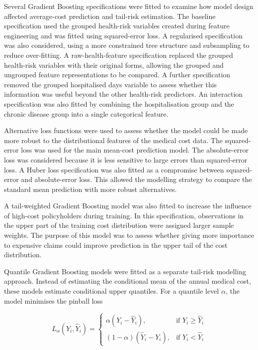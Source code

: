 	Several Gradient Boosting specifications were fitted to examine how model design affected average-cost prediction and tail-risk estimation. The baseline specification used the grouped health-risk variables created during feature engineering and was fitted using squared-error loss. A regularised specification was also considered, using a more constrained tree structure and subsampling to reduce over-fitting. A raw-health-feature specification replaced the grouped health-risk variables with their original forms, allowing the grouped and ungrouped feature representations to be compared. A further specification removed the grouped hospitalised days variable to assess whether this information was useful beyond the other health-risk predictors. An interaction specification was also fitted by combining the hospitalisation group and the chronic disease group into a single categorical feature.
	
	Alternative loss functions were used to assess whether the model could be made more robust to the distributional features of the medical cost data. The squared-error loss was used for the main mean-cost prediction model. The absolute-error loss was considered because it is less sensitive to large errors than squared-error loss. A Huber loss specification was also fitted as a compromise between squared-error and absolute-error loss. This allowed the modelling strategy to compare the standard mean prediction with more robust alternatives.
	
	A tail-weighted Gradient Boosting model was also fitted to increase the influence of high-cost policyholders during training. In this specification, observations in the upper part of the training cost distribution were assigned larger sample weights. The purpose of this model was to assess whether giving more importance to expensive claims could improve prediction in the upper tail of the cost distribution.
	
	Quantile Gradient Boosting models were fitted as a separate tail-risk modelling approach. Instead of estimating the conditional mean of the annual medical cost, these models estimate conditional upper quantiles. For a quantile level \(\alpha\), the model minimises the pinball loss
	
	\begin{equation} \label{eq:9}
		L_{\alpha}(Y_i, \hat{Y}_i)
		=
		\begin{cases}
			\alpha (Y_i - \hat{Y}_i), & \text{if } Y_i \geq \hat{Y}_i \\
			(1 - \alpha)(\hat{Y}_i - Y_i), & \text{if } Y_i < \hat{Y}_i
		\end{cases}
	\end{equation}
	
